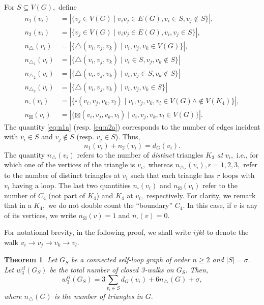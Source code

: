 \documentclass[12pt,a4paper,reqno]{amsart}
\numberwithin{equation}{section}
\theoremstyle{plain}
\newtheorem{theorem}{Theorem}[section]
\theoremstyle{definition}
\newcommand{\<}{\langle}
\renewcommand{\>}{\rangle}
\begin{document}
For $S \subseteq V(G),$ define
\begin{align}
n_1(v_i) &=\left|\{v_j \in V(G)\mid v_iv_j \in E(G) , v_i \in S, v_j \notin S\}\right|, \label{eq:n1a} \\
n_2(v_i) &=\left|\{v_j \in V(G)\mid v_iv_j \in E(G) , v_i,v_j \in S\}\right|, \label{eq:n2a} \\
n_\triangle(v_i) &= \left| \{\triangle(v_i,v_j,v_k) \mid v_i,v_j,v_k \in V(G)\} \right|, \label{eq:ntri}\\
n_{\triangle_1}(v_i) &= \left| \{\triangle(v_i,v_j,v_k) \mid v_i \in S, v_j,v_k \notin S\} \right| \label{eq:ntri1}\\
n_{\triangle_2}(v_i) &= \left| \{\triangle(v_i,v_j,v_k) \mid v_i, v_j \in S, v_k \notin S\} \right| \label{eq:ntri2} \\
n_{\triangle_3}(v_i) &= \left| \{\triangle(v_i,v_j,v_k) \mid v_i, v_j,  v_k \in S\} \right| \label{eq:ntri3} \\
n_{\square}(v_i) &= \left| \{\square(v_i,v_j,v_k,v_l) \mid v_i, v_j, v_k, v_l \in V(G) \wedge \notin V(K_4)\} \right| \label{eq:nC4}, \\
n_{\boxtimes}(v_i) &= \left| \{\boxtimes(v_i,v_j,v_k,v_l) \mid v_i, v_j, v_k, v_l \in V(G)\} \right| \label{eq:nK4}.
\end{align}
The quantity \eqref{eq:n1a} (resp. \eqref{eq:n2a}) corresponds to the number of edges incident with $v_i \in S$ and $v_j \notin S$ (resp. $v_j \in S$). Thus, 
\begin{equation}
\label{eq:n1n2}
n_1(v_i) + n_2(v_i) = d_G(v_i).
\end{equation} 
The quantity $n_\triangle(v_i)$ refers to the number of \textit{distinct} triangles $K_3$ \textit{at} $v_i,$ i.e., for which one of the vertices of the triangle is $v_i,$ whereas $n_{\triangle_r}(v_i), r=1,2,3,$ refer to the number of distinct triangles at $v_i$ such that each triangle has $r$ loops with $v_i$ having a loop. The last two quantities  $n_\square(v_i)$ and $n_\boxtimes(v_i)$ refer to the number of $C_4$ (not part of $K_4$) and $K_4$ at $v_i,$ respectively. For clarity, we remark that in a $K_4,$ we do not double count the ``boundary'' $C_4.$ In this case, if $v$ is any of its vertices, we write $n_{\boxtimes}(v)=1$ and $n_{\square}(v)=0.$


For notational brevity, in the following proof, we shall write  $ijkl$ to denote the walk $v_i \to v_j \to v_k \to v_l.$ 
\begin{theorem}
\label{closed3}
Let $G_S$ be a connected self-loop graph of order $n\geq 2$ and $|S|=\sigma.$ Let $w^{cl}_3(G_S)$ be the total number of closed 3-walks on $G_S.$ Then,
\begin{equation}
\label{eq:closed3}
w^{cl}_3(G_S)= 3 \sum_{v_i \in S} d_G(v_i) + 6 n_\triangle(G) + \sigma, 
\end{equation}
where $n_\triangle(G)$ is the number of triangles in $G.$ 
\end{theorem}
\end{document}

